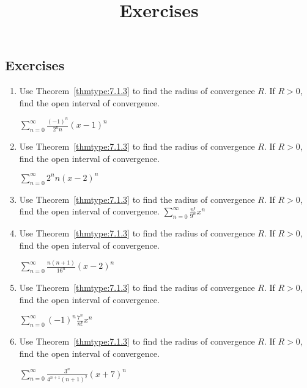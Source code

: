 \documentclass{ximera}
\title{Exercises} \license{CC BY-NC-SA 4.0}
\begin{document}
\begin{abstract}
\end{abstract}
\maketitle

\begin{onlineOnly}
\section*{Exercises}
\end{onlineOnly}


\begin{problem}\label{exer:7.1.1}
\begin{enumerate}

\item Use Theorem~\ref{thmtype:7.1.3} to find the radius of convergence $R$. If $R>0$, find the open interval of convergence.

$\sum_{n=0}^\infty \frac{(-1)^n}{2^nn}(x-1)^n$

\item Use Theorem~\ref{thmtype:7.1.3} to find the radius of convergence $R$. If $R>0$, find the open interval of convergence.

$\sum_{n=0}^\infty 2^nn(x-2)^n$

\item Use Theorem~\ref{thmtype:7.1.3} to find the radius of convergence $R$. If $R>0$, find the open interval of convergence.
$\sum_{n=0}^\infty \frac{n!}{9^n}x^n$

\item Use Theorem~\ref{thmtype:7.1.3} to find the radius of convergence $R$. If $R>0$, find the open interval of convergence.

$\sum_{n=0}^\infty\frac{n(n+1)}{16^n}(x-2)^n$

\item Use Theorem~\ref{thmtype:7.1.3} to find the radius of convergence $R$. If $R>0$, find the open interval of convergence.

$\sum_{n=0}^\infty (-1)^n\frac{7^n}{n!}x^n$

\item Use Theorem~\ref{thmtype:7.1.3} to find the radius of convergence $R$. If $R>0$, find the open interval of convergence.

$\sum_{n=0}^\infty \frac{3^n}{4^{n+1}(n+1)^2}(x+7)^n$
\end{enumerate}
\end{problem}
\end{document}
